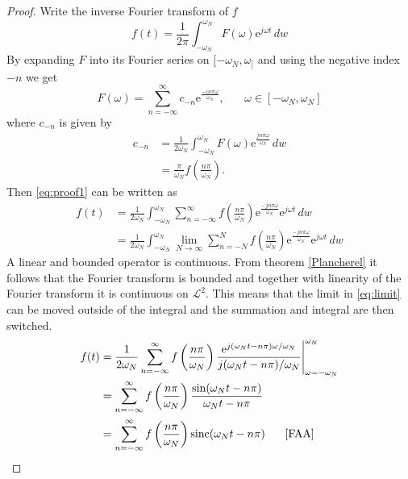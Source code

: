 \begin{proof}
Write the inverse Fourier transform of $f$
\begin{equation}\label{eq:proof1}
f(t)=\frac{1}{2\pi}\int_{-\omega_N}^{\omega_N}\!F(\omega)\mathrm{e}^{j\omega t}\,dw
\end{equation}
By expanding $F$ into its Fourier series on $[-\omega_N,\omega_]$ and using the negative index $-n$ we get
\begin{equation*}
F(\omega)=\sum_{n=-\infty}^{\infty}c_{-n}\mathrm{e}^{\frac{-in\pi\omega}{\omega_N}},\phantom{mm}\omega\in[-\omega_N,\omega_N]
\end{equation*}
where $c_{-n}$ is given by
\begin{align*}
c_{-n}&=\frac{1}{2\omega_N}\int_{-\omega_N}^{\omega_N}\!F(\omega)\mathrm{e}^{\frac{jn\pi\omega}{\omega_N}}\,dw\\
&=\frac{\pi}{\omega_N}f\left(\frac{n\pi}{\omega_N}\right).
\end{align*}
Then \eqref{eq:proof1} can be written as
\begin{align}
f(t)&=\frac{1}{2\omega_N}\int_{-\omega_N}^{\omega_N}\!\sum_{n=-\infty}^{\infty}f\left(\frac{n\pi}{\omega_N}\right)\mathrm{e}^{\frac{-jn\pi\omega}{\omega_N}}\mathrm{e}^{j\omega t}\,dw
\nonumber\\
&=\frac{1}{2\omega_N}\int_{-\omega_N}^{\omega_N}\!\lim_{N\to\infty}\sum_{n=-N}^{N}f\left(\frac{n\pi}{\omega_N}\right)\mathrm{e}^{\frac{-jn\pi\omega}{\omega_N}}\mathrm{e}^{j\omega t}\,dw\label{eq:limit}
\end{align}
A linear and bounded operator is continuous. From theorem \ref{Plancherel} it follows that the Fourier transform is bounded and together with linearity of the Fourier transform it is continuous on $\mathcal{L}^2$. This means that the limit in \eqref{eq:limit} can be moved outside of the integral and the summation and integral are then switched.
\begin{align*}
f(t)&=\frac{1}{2\omega_N}\sum_{n=-\infty}^{\infty}f\left(\frac{n\pi}{\omega_N}\right)\frac{\mathrm{e}^{j(\omega_Nt-n\pi)\omega/\omega_N}}{j(\omega_Nt-n\pi)/\omega_N}\Bigg|_{\omega=-\omega_N}^{\omega_N}
\\
&=\sum_{n=-\infty}^{\infty}f\left(\frac{n\pi}{\omega_N}\right)\frac{\sin(\omega_Nt-n\pi)}{\omega_Nt-n\pi}
\\
&=\sum_{n=-\infty}^{\infty}f\left(\frac{n\pi}{\omega_N}\right)\mathrm{sinc}(\omega_Nt-n\pi)\phantom{mm}\text{\cite{FAA}}
\end{align*}
\end{proof}
